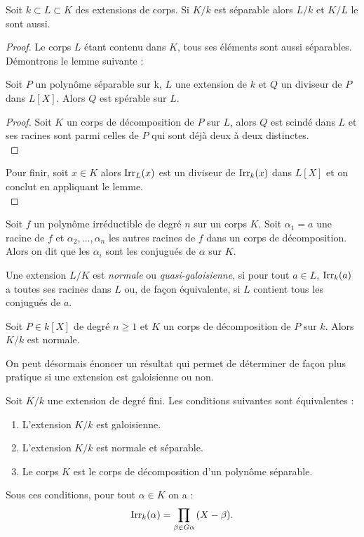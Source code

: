 \documentclass[a4paper]{article} %
\numberwithin{section}{part}
\numberwithin{equation}{section}
\newcommand\Irr[2]{\textup{Irr}_{#1}(#2)}
\begin{document}
\begin{prop}
Soit $k \subset L \subset K$ des extensions de corps. Si $K/k$ est séparable
alors $L/k$ et $K/L$ le sont aussi.
\end{prop}
\begin{proof}
Le corps $L$ étant contenu dans $K$, tous ses éléments sont aussi séparables.
Démontrons le lemme suivante :
\begin{lem}
\label{lem:divsep}
Soit $P$ un polynôme séparable sur k, $L$ une extension de $k$ et $Q$ un
diviseur de $P$ dans $L[X]$. Alors $Q$ est spérable sur $L$.
\end{lem}
\begin{proof}
Soit $K$ un corps de décomposition de $P$ sur $L$, alors $Q$ est scindé dans $L$
et ses racines sont parmi celles de $P$ qui sont déjà deux à deux distinctes.\\
\end{proof}
Pour finir, soit $x\in K$ alors $\Irr{L}{x}$ est un diviseur de $\Irr{k}{x}$ 
dans $L[X]$ et on conclut en appliquant le lemme.\\
\end{proof}

Soit $f$ un polynôme irréductible de degré $n$ sur un corps $K$. Soit $\alpha_1 
= a$ une racine de $f$ et $\alpha_2,\dots,\alpha_n$ les autres racines de $f$ 
dans un corps de décomposition. Alors on dit que les $\alpha_i$ sont les 
conjugués de $\alpha$ sur $K$.
\begin{defn}
Une extension $L/K$ est \emph{normale} ou \emph{quasi-galoisienne}, si pour tout
$a\in L$, $\Irr{k}{a}$ a toutes ses racines dans $L$ ou, de façon équivalente,
si $L$ contient tous les conjugués de $a$.
\end{defn}

\begin{prop}
\label{prop:decompnorm}
Soit $P\in k[X]$ de degré $n\geq 1$ et $K$ un corps de décomposition de $P$ sur
$k$. Alors $K/k$ est normale.
\end{prop}

On peut désormais énoncer un résultat qui permet de déterminer de façon plus
pratique si une extension est galoisienne ou non.

\begin{thm}
Soit $K/k$ une extension de degré fini. Les conditions suivantes sont
équivalentes :
\begin{enumerate}
\item L'extension $K/k$ est galoisienne.
\item L'extension $K/k$ est normale et séparable.
\item Le corps $K$ est le corps de décomposition d'un polynôme séparable.
\end{enumerate}
Sous ces conditions, pour tout $\alpha\in K$ on a :
\begin{equation}
\Irr{k}{\alpha} = \prod_{\beta\in G\alpha}{(X - \beta)}.
\end{equation}
\end{thm}
\end{document}
